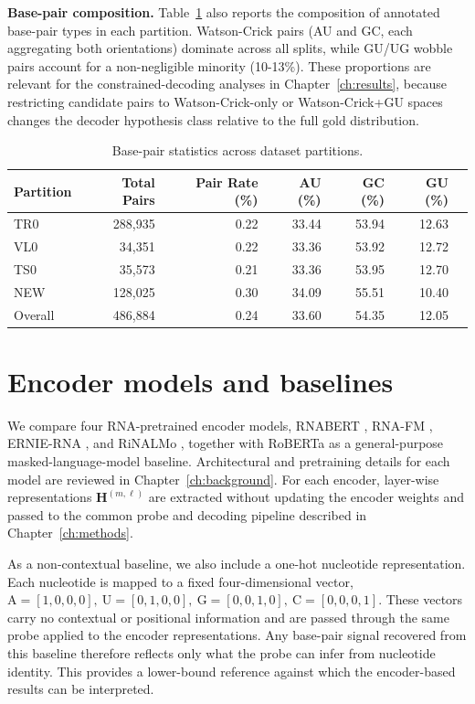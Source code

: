 \documentclass[logo,bsc,singlespacing,parskip]{infthesis}
\begin{document}
\textbf{Base-pair composition.}
Table~\ref{tab:pair_stats_combined} also reports the composition of
annotated base-pair types in each partition. Watson-Crick pairs (AU and
GC, each aggregating both orientations) dominate across all splits,
while GU/UG wobble pairs account for a non-negligible minority
(10-13\%). These proportions are relevant for the constrained-decoding
analyses in Chapter~\ref{ch:results}, because restricting candidate
pairs to Watson-Crick-only or Watson-Crick+GU spaces changes the
decoder hypothesis class relative to the full gold distribution.

\begin{table}[t]
\centering
\caption{Base-pair statistics across dataset partitions.}
\label{tab:pair_stats_combined}
\small
\begin{tabular}{lrrrrrr}
\toprule
Partition & Total Pairs & Pair Rate (\%) & AU (\%) & GC (\%) & GU (\%) \\
\midrule
TR0     & 288{,}935 & 0.22 & 33.44 & 53.94 & 12.63 \\
VL0     & 34{,}351  & 0.22 & 33.36 & 53.92 & 12.72 \\
TS0     & 35{,}573  & 0.21 & 33.36 & 53.95 & 12.70 \\
NEW     & 128{,}025 & 0.30 & 34.09 & 55.51 & 10.40 \\
\midrule
Overall & 486{,}884 & 0.24 & 33.60 & 54.35 & 12.05 \\
\bottomrule
\end{tabular}
\end{table}
\vspace{-1.0em}

\section{Encoder models and baselines}
\label{sec:exp_models}

We compare four RNA-pretrained encoder models, RNABERT \citep{akiyama2022rnabert}, RNA-FM \citep{chen2022rnafm}, ERNIE-RNA \citep{yin2025ernie}, and RiNALMo \citep{penic2025rinalmo}, together with RoBERTa \citep{liu2019roberta} as a general-purpose masked-language-model baseline. Architectural and pretraining details for each model are reviewed in Chapter~\ref{ch:background}. For each encoder, layer-wise representations
$\mathbf{H}^{(m,\ell)}$ are extracted without updating the
encoder weights and passed to the common probe and decoding
pipeline described in Chapter~\ref{ch:methods}.

As a non-contextual baseline, we also include a one-hot nucleotide representation. Each nucleotide is mapped to a fixed four-dimensional vector,
$\mathrm{A}=[1,0,0,0],\ \mathrm{U}=[0,1,0,0],\ \mathrm{G}=[0,0,1,0],\ \mathrm{C}=[0,0,0,1]$.
These vectors carry no contextual or positional information and
are passed through the same probe applied to the encoder
representations. Any base-pair signal recovered from this baseline therefore reflects only what the probe can infer from nucleotide identity. This provides a lower-bound reference against which the encoder-based results can be interpreted.
\end{document}
